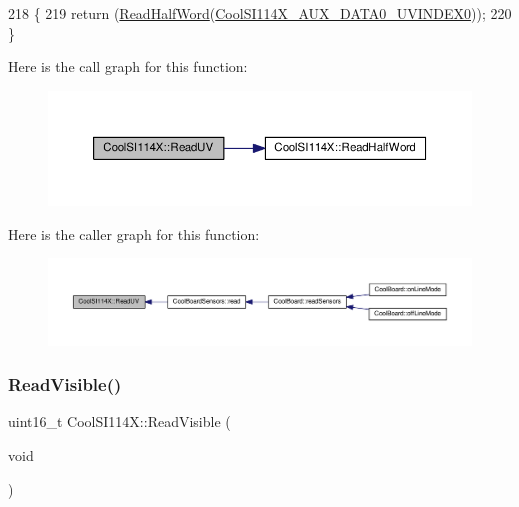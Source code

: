 \begin{DoxyCode}
218 \{
219   \textcolor{keywordflow}{return} (\hyperlink{class_cool_s_i114_x_a1d25c9e137874af529804c2ec796a6b9}{ReadHalfWord}(\hyperlink{_cool_s_i114_x_8h_a225f776e1de1cb6c35100f5a2535d0e5}{CoolSI114X\_AUX\_DATA0\_UVINDEX0}));    
220 \}
\end{DoxyCode}
Here is the call graph for this function\+:\nopagebreak
\begin{figure}[H]
\begin{center}
\leavevmode
\includegraphics[width=350pt]{dd/d67/class_cool_s_i114_x_a14ced664d74e93438440b0274109c111_cgraph}
\end{center}
\end{figure}
Here is the caller graph for this function\+:\nopagebreak
\begin{figure}[H]
\begin{center}
\leavevmode
\includegraphics[width=350pt]{dd/d67/class_cool_s_i114_x_a14ced664d74e93438440b0274109c111_icgraph}
\end{center}
\end{figure}
\mbox{\label{class_cool_s_i114_x_a42e0e574256341443c647a4c0eda87d5}} 
\subsubsection{\texorpdfstring{Read\+Visible()}{ReadVisible()}}
{\footnotesize\ttfamily uint16\+\_\+t Cool\+S\+I114\+X\+::\+Read\+Visible (\begin{DoxyParamCaption}\item[{void}]{ }\end{DoxyParamCaption})}



